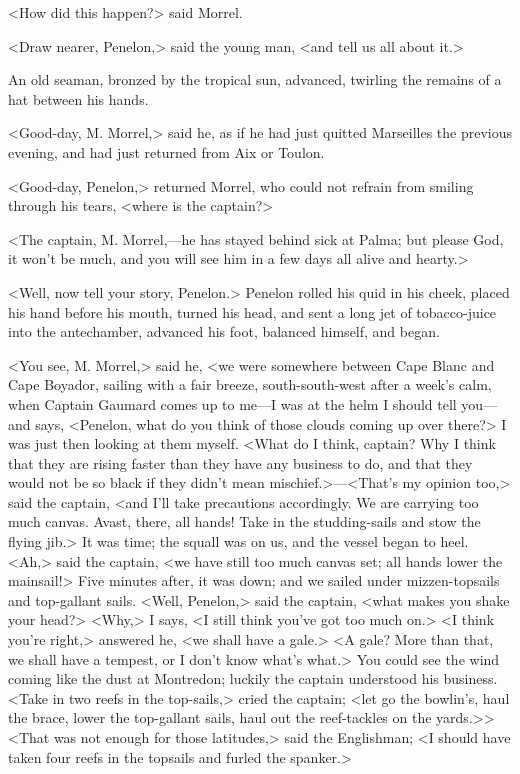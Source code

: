  <How did this happen?> said Morrel. 

 <Draw nearer, Penelon,> said the young man, <and tell us all about it.> 

 An old seaman, bronzed by the tropical sun, advanced, twirling the remains of a hat between his hands. 

 <Good-day, M. Morrel,> said he, as if he had just quitted Marseilles the previous evening, and had just returned from Aix or Toulon. 

 <Good-day, Penelon,> returned Morrel, who could not refrain from smiling through his tears, <where is the captain?> 

 <The captain, M. Morrel,—he has stayed behind sick at Palma; but please God, it won't be much, and you will see him in a few days all alive and hearty.> 

 <Well, now tell your story, Penelon.>  Penelon rolled his quid in his cheek, placed his hand before his mouth, turned his head, and sent a long jet of tobacco-juice into the antechamber, advanced his foot, balanced himself, and began. 

 <You see, M. Morrel,> said he, <we were somewhere between Cape Blanc and Cape Boyador, sailing with a fair breeze, south-south-west after a week's calm, when Captain Gaumard comes up to me—I was at the helm I should tell you—and says, <Penelon, what do you think of those clouds coming up over there?> I was just then looking at them myself. <What do I think, captain? Why I think that they are rising faster than they have any business to do, and that they would not be so black if they didn't mean mischief.>—<That's my opinion too,> said the captain, <and I'll take precautions accordingly. We are carrying too much canvas. Avast, there, all hands! Take in the studding-sails and stow the flying jib.> It was time; the squall was on us, and the vessel began to heel. <Ah,> said the captain, <we have still too much canvas set; all hands lower the mainsail!> Five minutes after, it was down; and we sailed under mizzen-topsails and top-gallant sails. <Well, Penelon,> said the captain, <what makes you shake your head?> <Why,> I says, <I still think you've got too much on.> <I think you're right,> answered he, <we shall have a gale.> <A gale? More than that, we shall have a tempest, or I don't know what's what.> You could see the wind coming like the dust at Montredon; luckily the captain understood his business. <Take in two reefs in the top-sails,> cried the captain; <let go the bowlin's, haul the brace, lower the top-gallant sails, haul out the reef-tackles on the yards.>>  <That was not enough for those latitudes,> said the Englishman; <I should have taken four reefs in the topsails and furled the spanker.> 

